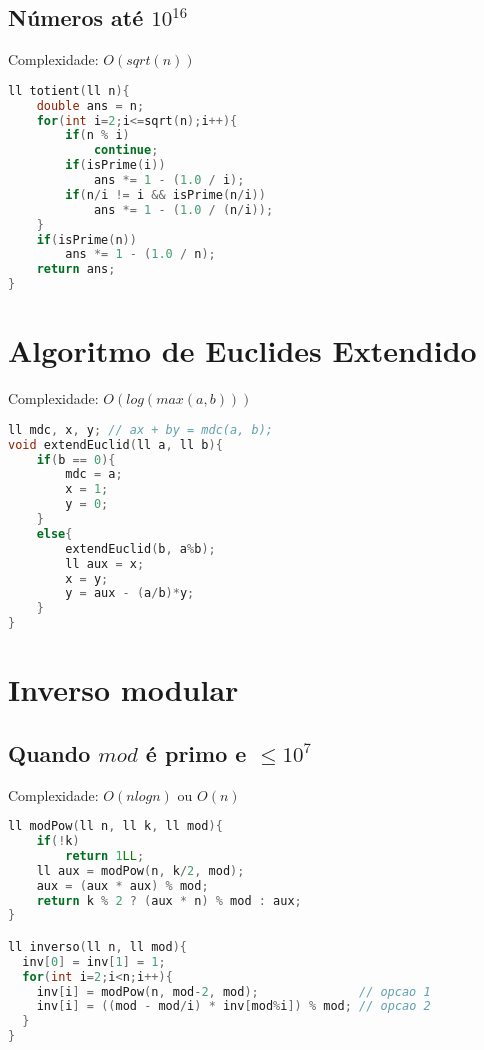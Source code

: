 \documentclass[12pt,a4paper,twoside]{report}
\begin{document}
\subsection{Números até $10^{16}$}
Complexidade: $O(sqrt(n))$
\noindent\begin{lstlisting}[caption=Totient sem crivo para números grandes,language=C++]
ll totient(ll n){
    double ans = n;
    for(int i=2;i<=sqrt(n);i++){
        if(n % i)
            continue;
        if(isPrime(i))
            ans *= 1 - (1.0 / i);
        if(n/i != i && isPrime(n/i))
            ans *= 1 - (1.0 / (n/i));
    }
    if(isPrime(n))
        ans *= 1 - (1.0 / n);
    return ans;
}
\end{lstlisting}



\section{Algoritmo de Euclides Extendido}
Complexidade: $O(log(max(a, b)))$
\noindent\begin{lstlisting}[caption=Algoritmo de Euclides Extendido,language=C++]
ll mdc, x, y; // ax + by = mdc(a, b);
void extendEuclid(ll a, ll b){
    if(b == 0){
        mdc = a;
        x = 1;
        y = 0;
    }
    else{
        extendEuclid(b, a%b);
        ll aux = x;
        x = y;
        y = aux - (a/b)*y;
    }
}
\end{lstlisting}

\section{Inverso modular}

\subsection{Quando $mod$ é primo e $\le 10^7$}
Complexidade: $O(n log n)$ ou $O(n)$
\noindent\begin{lstlisting}[caption=Inverso modular para números primos,language=C++]
ll modPow(ll n, ll k, ll mod){
    if(!k) 
        return 1LL;
    ll aux = modPow(n, k/2, mod);
    aux = (aux * aux) % mod;
    return k % 2 ? (aux * n) % mod : aux;
}

ll inverso(ll n, ll mod){
  inv[0] = inv[1] = 1;
  for(int i=2;i<n;i++){
    inv[i] = modPow(n, mod-2, mod);              // opcao 1
    inv[i] = ((mod - mod/i) * inv[mod%i]) % mod; // opcao 2
  }
}
\end{lstlisting}
\end{document}
